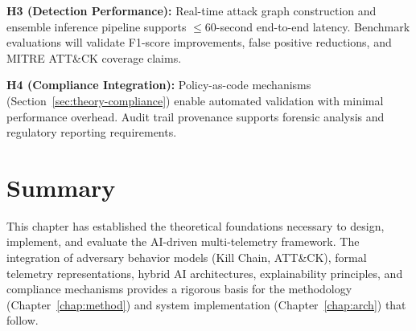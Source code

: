 \textbf{H3 (Detection Performance):} Real-time attack graph construction and ensemble inference pipeline supports $\leq$60-second end-to-end latency. Benchmark evaluations will validate F1-score improvements, false positive reductions, and MITRE ATT\&CK coverage claims.

\textbf{H4 (Compliance Integration):} Policy-as-code mechanisms (Section~\ref{sec:theory-compliance}) enable automated validation with minimal performance overhead. Audit trail provenance supports forensic analysis and regulatory reporting requirements.

\section{Summary}
This chapter has established the theoretical foundations necessary to design, implement, and evaluate the AI-driven multi-telemetry framework. The integration of adversary behavior models (Kill Chain, ATT\&CK), formal telemetry representations, hybrid AI architectures, explainability principles, and compliance mechanisms provides a rigorous basis for the methodology (Chapter~\ref{chap:method}) and system implementation (Chapter~\ref{chap:arch}) that follow.
